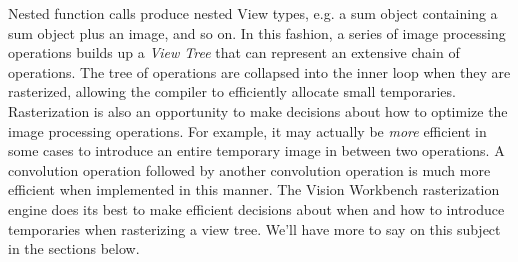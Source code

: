 Nested function calls produce nested View types, e.g. a sum object
containing a sum object plus an image, and so on.  In this fashion, a
series of image processing operations builds up a {\em View Tree} that
can represent an extensive chain of operations.  The tree of
operations are collapsed into the inner loop when they are rasterized,
allowing the compiler to efficiently allocate small temporaries.
Rasterization is also an opportunity to make decisions about how to
optimize the image processing operations.  For example, it may
actually be {\em more} efficient in some cases to introduce an entire
temporary image in between two operations.  A convolution operation
followed by another convolution operation is much more efficient when
implemented in this manner.  The Vision Workbench rasterization engine
does its best to make efficient decisions about when and how to
introduce temporaries when rasterizing a view tree.  We'll have more
to say on this subject in the sections below.







